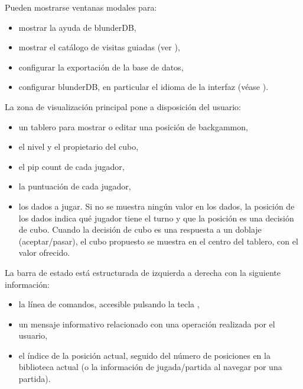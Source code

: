 \documentclass[letterpaper,10pt,spanish]{sphinxmanual}
\begin{document}
\sphinxAtStartPar
Pueden mostrarse ventanas modales para:
\begin{itemize}
\item {} 
\sphinxAtStartPar
mostrar la ayuda de blunderDB,

\item {} 
\sphinxAtStartPar
mostrar el catálogo de visitas guiadas (ver {\hyperref[\detokenize{manuel:visites-guidees}]{}}),

\item {} 
\sphinxAtStartPar
configurar la exportación de la base de datos,

\item {} 
\sphinxAtStartPar
configurar blunderDB, en particular el idioma de la interfaz (véase {\hyperref[\detokenize{manuel:configuration}]{}}).

\end{itemize}

\sphinxAtStartPar
La zona de visualización principal pone a disposición del usuario:
\begin{itemize}
\item {} 
\sphinxAtStartPar
un tablero para mostrar o editar una posición de backgammon,

\item {} 
\sphinxAtStartPar
el nivel y el propietario del cubo,

\item {} 
\sphinxAtStartPar
el pip count de cada jugador,

\item {} 
\sphinxAtStartPar
la puntuación de cada jugador,

\item {} 
\sphinxAtStartPar
los dados a jugar. Si no se muestra ningún valor en los dados, la posición de los dados indica qué jugador tiene el turno y que la posición es una decisión de cubo. Cuando la decisión de cubo es una respuesta a un doblaje (aceptar/pasar), el cubo propuesto se muestra en el centro del tablero, con el valor ofrecido.

\end{itemize}

\sphinxAtStartPar
La barra de estado está estructurada de izquierda a derecha con la siguiente información:
\begin{itemize}
\item {} 
\sphinxAtStartPar
la línea de comandos, accesible pulsando la tecla ,

\item {} 
\sphinxAtStartPar
un mensaje informativo relacionado con una operación realizada por el usuario,

\item {} 
\sphinxAtStartPar
el índice de la posición actual, seguido del número de posiciones en la biblioteca actual (o la información de jugada/partida al navegar por una partida).

\end{itemize}
\end{document}
